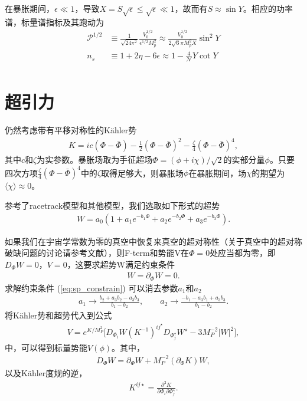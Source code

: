 在暴胀期间，$\epsilon \ll 1$，导致$X=S\sqrt{\epsilon}\leq\sqrt{\epsilon}\ll
1$，故而有$S\approx \sin Y$。相应的功率谱，标量谱指标及其跑动为
\begin{align}
    \mathcal{P}^{1/2}&\equiv\frac{1}{\sqrt{24\pi^2}}\frac{V_0^{1/2}}{\epsilon^{1/2}M_p^2}
    \approx\frac{V_0^{1/2}}{2\sqrt{6}\pi M_p^2 X}\sin^2Y\\
    n_s&\equiv1+2\eta-6\epsilon\approx1-\frac{4}{\mathcal{N}}Y\cot Y\\
\end{align}
\section{超引力}

仍然考虑带有平移对称性的K\"ahler势\citep{ketov2016susy}
\begin{align}
    K=ic(\Phi-\bar\Phi)-\frac{1}{2}{(\Phi-\bar\Phi)}^2-\frac{\zeta}{4}{(\Phi-\bar\Phi)}^4,
\end{align}
其中$c$和$\zeta$为实参数。暴胀场取为手征超场$\Phi=(\phi+i\chi)/\sqrt{2}$的实部分量$\phi$。只要四次方项$\frac{\zeta}{4}{(\Phi-\bar\Phi)}^4$中的$\zeta$取得足够大，则暴胀场$\phi$在暴胀期间，场$\chi$的期望为$\langle\chi\rangle\approx0$。

参考了racetrack模型\citep{krasnikov1987supersymmetry,escoda2003saltatory,blanco2005racetrack}和其他模型\citep{ketov2016susy}，我们选取如下形式的超势
\begin{align}
    W=a_0(1+a_1e^{-b_1\Phi}+a_2e^{-b_2\Phi}+a_3e^{-b_3\Phi}).
\end{align}

如果我们在宇宙学常数为零的真空中恢复来真空的超对称性（关于真空中的超对称破缺问题的讨论请参考文献\citep{gao2015inflection}），则F-term和势能V在$\Phi=0$处应当都为零，即$D_{\Phi}W=0$，$V=0$，这要求超势W满足约束条件
\begin{align}\label{eq:sp_constrain}
    W=\partial_{\Phi}W=0.
\end{align}
求解约束条件 (\ref{eq:sp_constrain}) 可以消去参数$a_1$和$a_2$
\begin{align}
    a_1\rightarrow \frac{b_2+a_3b_2-a_3b_3}{b_1-b_2},\qquad 
    a_2\rightarrow \frac{-b_1-a_3b_1+a_3b_3}{b_1-b_2}.
\end{align}
将K\"ahler势和超势代入到公式
\begin{align}
    V=e^{K/M^2_P}\lbrack
    D_{\Phi_i}W{(K^{-1})}^{ij^{\star}}D_{\Phi^{\star}_j}W^{\star}-3M^{-2}_P|W|^2\rbrack,
\end{align}
中，可以得到标量势能$V(\phi)$。其中，
\begin{align}
    D_{\Phi}W=\partial_{\Phi}W+M^{-2}_P{(\partial_{\Phi}K)}W,
\end{align}
以及K\"ahler度规的逆，
\begin{align}
    K^{ij\star} = \frac{\partial^2K}{\partial\Phi_i\partial\Phi^{\star}_j}.
\end{align}

